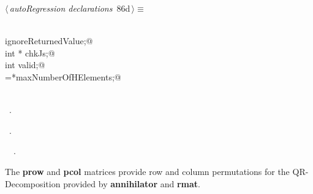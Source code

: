 \documentclass{article}
\begin{document}
\begin{flushleft} \small
\begin{minipage}{\linewidth}\label{scrap147}\raggedright\small
{} $\langle\,${\itshape autoRegression declarations}\nobreak\ {\footnotesize {86d}}$\,\rangle\equiv$
\vspace{-1ex}
\begin{list}{}{} \item
\mbox{}\verb@@\\
\mbox{}\verb@int ignoreReturnedValue;@\\
\mbox{}\verb@  int * chkJs;@\\
\mbox{}\verb@  int valid;@\\
\mbox{}\verb@originalMaxHElements=*maxNumberOfHElements;@\\
\mbox{}\verb@@\\
\mbox{}\verb@@{\NWsep}
\end{list}
\vspace{-1.5ex}
\footnotesize
\begin{list}{}{\setlength{\itemsep}{-\parsep}\setlength{\itemindent}{-\leftmargin}}
\item \NWtxtMacroDefBy\ .
\item \NWtxtMacroRefIn\ .
\item \NWtxtIdentsUsed\nobreak\  \verb@maxNumberOfHElements@\nobreak\ .
\item{}
\end{list}
\end{minipage}\vspace{4ex}
\end{flushleft}
The {\bf prow} and {\bf pcol} matrices provide row and column permutations
for the QR-Decomposition provided by {\bf annihilator} and {\bf rmat}.
\end{document}
